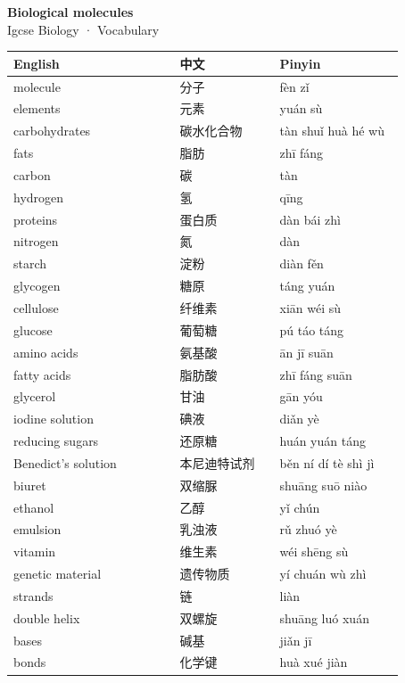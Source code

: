\documentclass[11pt]{article}
\begin{document}
\begin{center}
  {\LARGE\bfseries Biological molecules}\\[0.35em]
  {\large Igcse Biology · Vocabulary}
\end{center}
\vspace{0.6em}

\begin{longtable}{@{}p{0.40\linewidth}p{0.24\linewidth}p{0.30\linewidth}@{}}
\toprule
\textbf{English} & \textbf{中文} & \textbf{Pinyin} \\
\midrule
\endhead
\bottomrule
\endlastfoot
molecule & 分子 & fèn zǐ \\
elements & 元素 & yuán sù \\
carbohydrates & 碳水化合物 & tàn shuǐ huà hé wù \\
fats & 脂肪 & zhī fáng \\
carbon & 碳 & tàn \\
hydrogen & 氢 & qīng \\
proteins & 蛋白质 & dàn bái zhì \\
nitrogen & 氮 & dàn \\
starch & 淀粉 & diàn fěn \\
glycogen & 糖原 & táng yuán \\
cellulose & 纤维素 & xiān wéi sù \\
glucose & 葡萄糖 & pú táo táng \\
amino acids & 氨基酸 & ān jī suān \\
fatty acids & 脂肪酸 & zhī fáng suān \\
glycerol & 甘油 & gān yóu \\
iodine solution & 碘液 & diǎn yè \\
reducing sugars & 还原糖 & huán yuán táng \\
Benedict's solution & 本尼迪特试剂 & běn ní dí tè shì jì \\
biuret & 双缩脲 & shuāng suō niào \\
ethanol & 乙醇 & yǐ chún \\
emulsion & 乳浊液 & rǔ zhuó yè \\
vitamin & 维生素 & wéi shēng sù \\
genetic material & 遗传物质 & yí chuán wù zhì \\
strands & 链 & liàn \\
double helix & 双螺旋 & shuāng luó xuán \\
bases & 碱基 & jiǎn jī \\
bonds & 化学键 & huà xué jiàn \\
\end{longtable}
\end{document}
